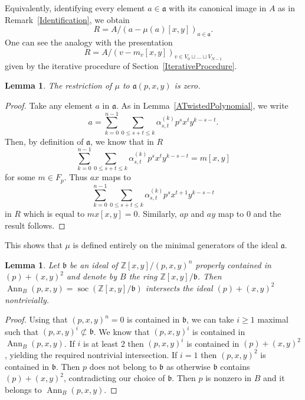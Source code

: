 \documentclass[11pt]{article}
\DeclareMathOperator{\Ann}{Ann}
\DeclareMathOperator{\soc}{soc}
\newtheorem{lemma}[corollary]{Lemma}
\theoremstyle{definition}
\begin{document}
Equivalently, identifying every element $a\in \mathfrak{a}$ with its canonical image in $A$ as in Remark~\ref{Identification}, we obtain
\[R=A/\left(a-\mu(a)[x,y]\right)_{a\in\mathfrak{a}}.\]
One can see the analogy with the presentation
\[R=A/\left(v-m_v[x,y]\right)_{v\in V_0\sqcup\ldots\sqcup V_{N-1}}\]
given by the iterative procedure of Section~\ref{IterativeProcedure}.

\begin{lemma}\label{muSurface}
The restriction of $\mu$ to $\mathfrak{a}(p,x,y)$ is zero.
\end{lemma}

\begin{proof}
Take any element $a$ in $\mathfrak{a}$. As in Lemma~\ref{ATwistedPolynomial}, we write
\[a=\sum_{k=0}^{n-1}\sum_{0\leq s+t\leq k}\alpha_{s,t}^{(k)}p^sx^ty^{k-s-t}.\]
Then, by definition of $\mathfrak{a}$, we know that in $R$
\[\sum_{k=0}^{n-1}\sum_{0\leq s+t\leq k}\alpha_{s,t}^{(k)}p^sx^ty^{k-s-t}=m[x,y]\]
for some $m\in F_p$. Thus $ax$ maps to
\[\sum_{k=0}^{n-1}\sum_{0\leq s+t\leq k}\alpha_{s,t}^{(k)}p^{s}x^{t+1}y^{k-s-t}\]
in $R$ which is equal to $mx[x,y]=0$. Similarly, $ap$ and $ay$ map to $0$ and the result follows.
\end{proof}

This shows that $\mu$ is defined entirely on the minimal generators of the ideal $\mathfrak{a}$.

\begin{lemma}\label{SocleIntersectsDegree2}
Let $\mathfrak{b}$ be an ideal of $\mathbb{Z}[x,y]/(p,x,y)^n$ properly contained in $(p)+(x,y)^2$ and denote by $B$ the ring $\mathbb{Z}[x,y]/\mathfrak{b}$. Then $\Ann_B(p,x,y)=\soc\left(\mathbb{Z}[x,y]/\mathfrak{b}\right)$ intersects the ideal $(p)+(x,y)^2$ nontrivially.
\end{lemma}

\begin{proof}
Using that $(p,x,y)^n=0$ is contained in $\mathfrak{b}$, we can take $i\geq 1$ maximal such that $(p,x,y)^i\not\subset \mathfrak{b}$. We know that $(p,x,y)^i$ is contained in $\Ann_B(p,x,y)$. If $i$ is at least 2 then $(p,x,y)^i$ is contained in $(p)+(x,y)^2$, yielding the required nontrivial intersection. If $i=1$ then $(p,x,y)^2$ is contained in $\mathfrak{b}$. Then $p$ does not belong to $\mathfrak{b}$ as otherwise $\mathfrak{b}$ contains $(p)+(x,y)^2$, contradicting our choice of $\mathfrak{b}$. Then $p$ is nonzero in $B$ and it belongs to $\Ann_B(p,x,y)$.
\end{proof}
\end{document}
